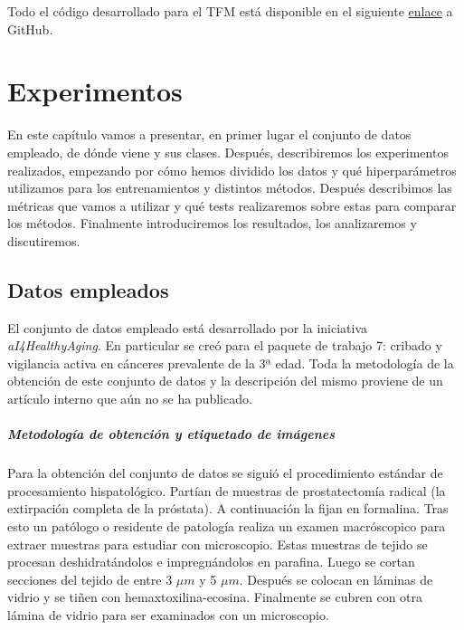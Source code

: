 Todo el código desarrollado para el TFM está disponible en el siguiente \href{https://github.com/CarlosLaraCasanova/Codigo_TFM/tree/main}{enlace} a GitHub.


\clearpage


\newpage
\chapter{Experimentos} \label{cap:exp}

En este capítulo vamos a presentar, en primer lugar el conjunto de datos empleado, de dónde viene y sus clases. Después, describiremos los experimentos realizados, empezando por cómo hemos dividido los datos y qué hiperparámetros utilizamos para los entrenamientos y distintos métodos. Después describimos las métricas que vamos a utilizar y qué tests realizaremos sobre estas para comparar los métodos. Finalmente introduciremos los resultados, los analizaremos y discutiremos.

\section{Datos empleados} \label{sec:datos}

El conjunto de datos empleado está desarrollado por la iniciativa \textit{aI4HealthyAging}. En particular se creó para el paquete de trabajo 7: cribado y vigilancia activa en cánceres prevalente de la 3ª edad. Toda la metodología de la obtención de este conjunto de datos y la descripción del mismo proviene de un artículo interno que aún no se ha publicado.

\paragraph*{Metodología de obtención y etiquetado de imágenes}

Para la obtención del conjunto de datos se siguió el procedimiento estándar de procesamiento hispatológico. Partían de muestras de prostatectomía radical (la extirpación completa de la próstata). A continuación la fijan en formalina. Tras esto un patólogo o residente de patología realiza un examen macróscopico para extraer muestras para estudiar con microscopio. Estas muestras de tejido se procesan deshidratándolos e impregnándolos en parafina. Luego se cortan secciones del tejido de entre 3 $\mu m$ y 5 $\mu m$. Después se colocan en láminas de vidrio y se tiñen con hemaxtoxilina-ecosina. Finalmente se cubren con otra lámina de vidrio para ser examinados con un microscopio.

